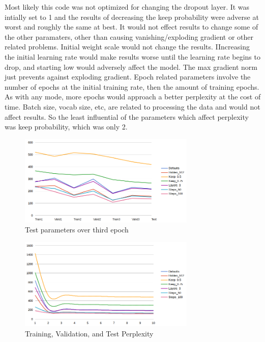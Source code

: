 \documentclass[10pt,a4paper]{article}
\begin{document}
Most likely this code was not optimized for changing the dropout layer. It was intially set to 1 and the results of decreasing the keep probability were adverse at worst and roughly the same at best. It would not effect results to change some of the other paramaters, other than causing vanishing/exploding gradient or other related problems. Initial weight scale would not change the results. IIncreasing the initial learning rate would make results worse until the learning rate begins to drop, and starting low would adversely affect the model. The max gradient norm just prevents against exploding gradient. Epoch related parameters involve the number of epochs at the initial training rate, then the amount of training epochs. As with any mode, more epochs would approach a better perplexity at the cost of time. Batch size, vocab size, etc, are related to processing the data and would not affect results. So the least influential of the parameters which affect perplexity was keep probability, which was only 2.



\begin{figure}[t]
  \begin{center}
    \includegraphics[width=0.75\textwidth]{epochs.png}
    \caption{Test parameters over third epoch}
  \end{center}
\end{figure}


\begin{figure}[b]
  \begin{center}
    \includegraphics[width=0.75\textwidth] {train-valid-test.png}
    \caption{Training, Validation, and Test Perplexity}
  \end{center}
\end{figure}
\end{document}
